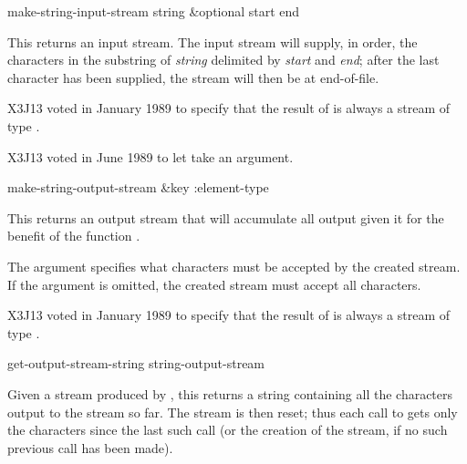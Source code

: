 \begin{defun}[Function]
make-string-input-stream string &optional start end

This returns an input stream.
The input stream will supply, in order, the characters in the substring
of \emph{string} delimited by \emph{start} and \emph{end}; after the last
character has been supplied, the stream will then be at end-of-file.

\begin{new}
X3J13 voted in January 1989
to specify that the result of
 is always a stream of type .
\end{new}
\end{defun}

\begin{newer}
X3J13 voted in June 1989 
to let  take an  argument.

\begin{defun}[Function]
make-string-output-stream &key :element-type

This returns an output stream that will 
accumulate all output given it for the benefit of the function
.

The  argument specifies what characters
must be accepted by the created stream.  If the  argument
is omitted, the created stream must accept all characters.

X3J13 voted in January 1989
to specify that the result of
 is always a stream of type .
\end{defun}
\end{newer}


\begin{defun}[Function]
get-output-stream-string string-output-stream

Given a stream produced by , this
returns a string containing all the characters output to the stream so far.
The stream is then reset; thus each call to 
gets only the characters since the last such call (or the creation
of the stream, if no such previous call has been made).
\end{defun}

